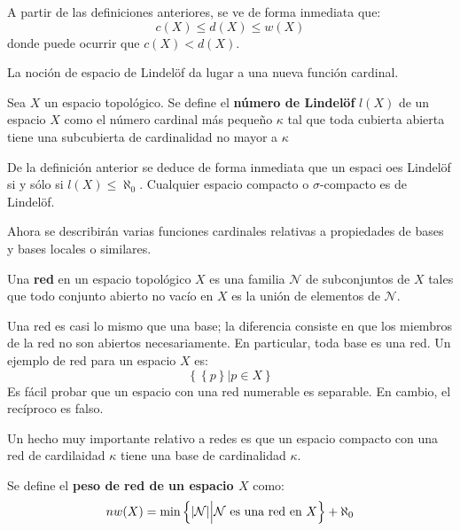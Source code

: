 \documentclass[12pt]{report}
\theoremstyle{largebreak}
\newcommand\abs[1]{\ensuremath{\lvert#1\rvert}}
\begin{document}
    A partir de las definiciones anteriores, se ve de forma inmediata que:
    \begin{equation*}
        c(X)\leq d(X)\leq w(X)
    \end{equation*}
    donde puede ocurrir que $c(X)<d(X)$.

    La noción de espacio de Lindelöf da lugar a una nueva función cardinal.

    \begin{mydef}
        Sea $X$ un espacio topológico. Se define el \textbf{número de Lindelöf} $l(X)$ de un espacio $X$ como el número cardinal más pequeño $\kappa$ tal que toda cubierta abierta tiene una subcubierta de cardinalidad no mayor a $\kappa$
    \end{mydef}

    De la definición anterior se deduce de forma inmediata que un espaci oes Lindelöf si y sólo si $l(X)\leq\aleph_0$. Cualquier espacio compacto o $\sigma$-compacto es de Lindelöf.

    Ahora se describirán varias funciones cardinales relativas a propiedades de bases y bases locales o similares.

    \begin{mydef}
        Una \textbf{red} en un espacio topológico $X$ es una familia $\mathcal{N}$ de subconjuntos de $X$ tales que todo conjunto abierto no vacío en $X$ es la unión de elementos de $\mathcal{N}$.
    \end{mydef}

    \begin{obs}
        Una red es casi lo mismo que una base; la diferencia consiste en que los miembros de la red no son abiertos necesariamente. En particular, toda base es una red. Un ejemplo de red para un espacio $X$ es:
        \begin{equation*}
            \left\{\left\{p \right\}\Big| p\in X \right\}
        \end{equation*}
        Es fácil probar que un espacio con una red numerable es separable. En cambio, el recíproco es falso.
    \end{obs}

    Un hecho muy importante relativo a redes es que un espacio compacto con una red de cardilaidad $\kappa$ tiene una base de cardinalidad $\kappa$.

    \begin{mydef}
        Se define el \textbf{peso de red de un espacio $X$} como:
        \begin{equation*}
            nw(X)=\min\left\{\abs{\mathcal{N}}\Big|\mathcal{N}\textup{ es una red en }X \right\}+\aleph_0
        \end{equation*}
    \end{mydef}
\end{document}
